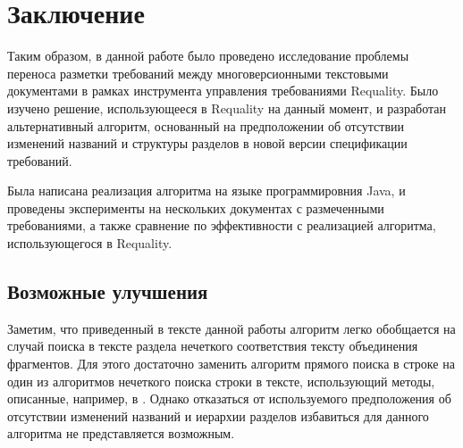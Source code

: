 \section{Заключение}
\label{sec:Chapter6} 

Таким образом, в данной работе было проведено исследование проблемы переноса разметки требований между многоверсионными текстовыми документами в рамках инструмента управления требованиями Requality. Было изучено решение, использующееся в Requality на данный момент, и разработан альтернативный алгоритм, основанный на предположении об отсутствии изменений названий и структуры разделов в новой версии спецификации требований.

Была написана реализация алгоритма на языке программировния Java, и проведены эксперименты на нескольких документах с размеченными требованиями, а также сравнение по эффективности с реализацией алгоритма, использующегося в Requality.

\subsection{Возможные улучшения}

Заметим, что приведенный в тексте данной работы алгоритм легко обобщается на случай поиска в тексте раздела нечеткого соответствия тексту объединения фрагментов. Для этого достаточно заменить алгоритм прямого поиска в строке на один из алгоритмов нечеткого поиска строки в тексте, использующий методы, описанные, например, в \cite{web:StrNotExact}. Однако отказаться от используемого предположения об отсутствии изменений названий и иерархии разделов избавиться для данного алгоритма не представляется возможным.
